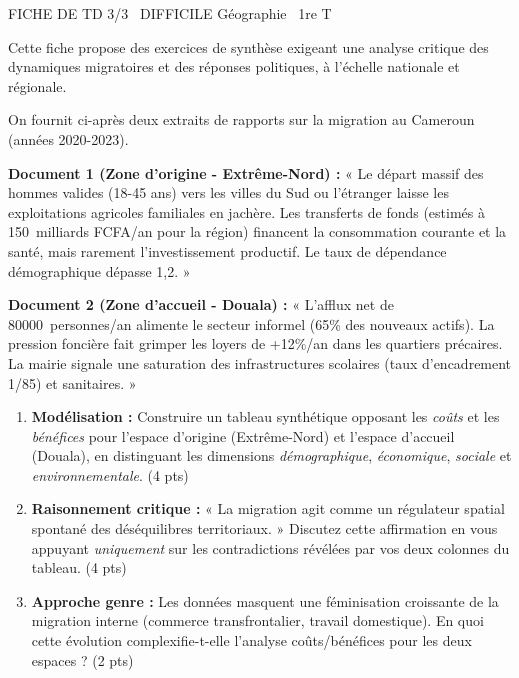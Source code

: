 \documentclass[11pt]{article}
\begin{document}
\begin{tcolorbox}[enhanced,colback=popink,colframe=popink,arc=10pt,boxrule=0pt,left=12pt,right=12pt,top=9pt,bottom=9pt]
{\color{white}\popxbold\small FICHE DE TD 3/3 \textbullet\ DIFFICILE \hfill Géographie \textbullet\ 1re T\par}
\end{tcolorbox}
\vspace{4pt}
Cette fiche propose des exercices de synthèse exigeant une analyse critique des dynamiques migratoires et des réponses politiques, à l'échelle nationale et régionale.

\begin{exercice}
\label{exo:incidences}
On fournit ci-après deux extraits de rapports sur la migration au Cameroun (années 2020-2023).

\textbf{Document 1 (Zone d'origine - Extrême-Nord) :} « Le départ massif des hommes valides (18-45 ans) vers les villes du Sud ou l'étranger laisse les exploitations agricoles familiales en jachère. Les transferts de fonds (estimés à \SI{150}{milliards} FCFA/an pour la région) financent la consommation courante et la santé, mais rarement l'investissement productif. Le taux de dépendance démographique dépasse 1,2. »

\textbf{Document 2 (Zone d'accueil - Douala) :} « L'afflux net de \SI{80000}{personnes/an} alimente le secteur informel (65\% des nouveaux actifs). La pression foncière fait grimper les loyers de +12\%/an dans les quartiers précaires. La mairie signale une saturation des infrastructures scolaires (taux d'encadrement 1/85) et sanitaires. »

\begin{enumerate}
    \item \textbf{Modélisation :} Construire un tableau synthétique opposant les \textit{coûts} et les \textit{bénéfices} pour l'espace d'origine (Extrême-Nord) et l'espace d'accueil (Douala), en distinguant les dimensions \textit{démographique}, \textit{économique}, \textit{sociale} et \textit{environnementale}. (4 pts)
    \item \textbf{Raisonnement critique :} « La migration agit comme un régulateur spatial spontané des déséquilibres territoriaux. » Discutez cette affirmation en vous appuyant \textit{uniquement} sur les contradictions révélées par vos deux colonnes du tableau. (4 pts)
    \item \textbf{Approche genre :} Les données masquent une féminisation croissante de la migration interne (commerce transfrontalier, travail domestique). En quoi cette évolution complexifie-t-elle l'analyse coûts/bénéfices pour les deux espaces ? (2 pts)
\end{enumerate}
\end{exercice}
\end{document}
